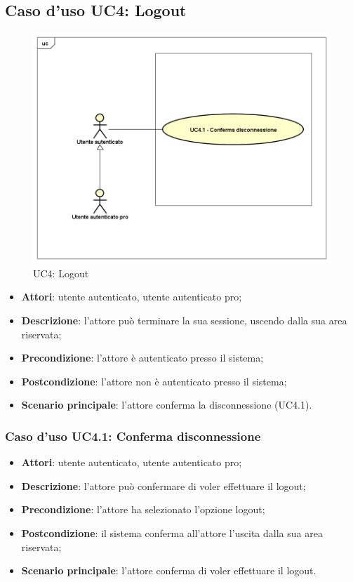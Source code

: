\newpage
\subsection{Caso d'uso UC4: Logout}
	\label{UC4}
	\begin{figure}[h]
		\centering
			\includegraphics[scale=0.5,keepaspectratio]{UML/UC4.png}
		\caption{UC4: Logout}
	\end{figure}
	\FloatBarrier
	\begin{itemize}
		\item
			\textbf{Attori}: utente autenticato, utente autenticato pro;
		\item		
			\textbf{Descrizione}: l'attore può terminare la sua sessione, uscendo dalla sua area riservata;
		\item
			\textbf{Precondizione}: l'attore è autenticato presso il sistema;
		\item
			\textbf{Postcondizione}: l'attore non è autenticato presso il sistema;
		\item
			\textbf{Scenario principale}: l'attore conferma la disconnessione (UC4.1).
	\end{itemize}

\subsubsection{Caso d'uso UC4.1: Conferma disconnessione}
	\begin{itemize}
		\item
			\textbf{Attori}: utente autenticato, utente autenticato pro;
		\item
			\textbf{Descrizione}: l'attore può confermare di voler effettuare il logout;
 		\item
			\textbf{Precondizione}: l'attore ha selezionato l'opzione logout;
		\item
			\textbf{Postcondizione}: il sistema conferma all'attore l'uscita dalla sua area riservata;
		\item
			\textbf{Scenario principale}: l'attore conferma di voler effettuare il logout.
	\end{itemize}		
	